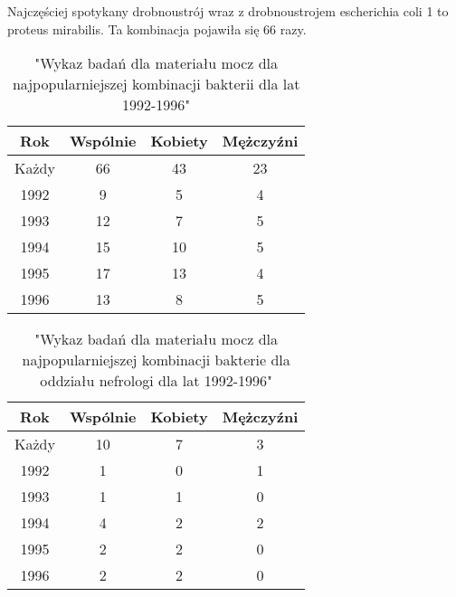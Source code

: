 \documentclass[a4paper,11pt]{article}
\begin{document}
Najczęściej spotykany drobnoustrój wraz z drobnoustrojem escherichia coli 1 to proteus mirabilis.
Ta kombinacja pojawiła się 66 razy.



\begin{table}[h]
  \begin{center}
  \caption{"Wykaz badań dla materiału mocz dla najpopularniejszej kombinacji bakterii dla lat 1992-1996"}
  \begin{tabular}{|c|c|c|c|}
    \hline Rok &Wspólnie & Kobiety & Mężczyźni \\ \hline
    Każdy& 66& 43& 23 \\ \hline 
    1992& 9& 5& 4 \\ \hline
    1993& 12& 7& 5 \\ \hline
    1994& 15& 10& 5 \\ \hline
    1995& 17& 13& 4 \\ \hline
    1996& 13& 8& 5 \\ \hline
    
  \end{tabular}
\end{center}
\end{table}

\begin{table}[h]
  \begin{center}
  \caption{"Wykaz badań dla materiału mocz dla najpopularniejszej kombinacji bakterie dla oddziału nefrologi dla lat 1992-1996"}
  \begin{tabular}{|c|c|c|c|}
    \hline Rok &Wspólnie & Kobiety & Mężczyźni \\ \hline
Każdy& 10& 7& 3 \\ \hline 
1992& 1& 0& 1 \\ \hline
1993& 1& 1& 0 \\ \hline
1994& 4& 2& 2 \\ \hline
1995& 2& 2& 0 \\ \hline
1996& 2& 2& 0 \\ \hline
  \end{tabular}
\end{center}
\end{table}
\end{document}
